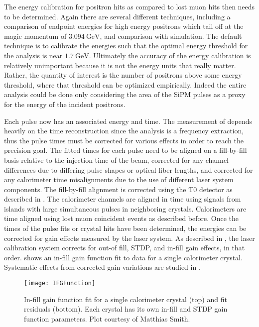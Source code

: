 The energy calibration for positron hits as compared to lost muon hits then needs to be determined. Again there are several different techniques, including a comparison of endpoint energies for high energy positrons which tail off at the magic momentum of $\SI{3.094}{\GeV}$, and comparison with simulation. The default technique is to calibrate the energies such that the optimal energy threshold for the \wa analysis is near $\SI{1.7}{\GeV}$. Ultimately the accuracy of the energy calibration is relatively unimportant because it is not the energy units that really matter. Rather, the quantity of interest is the number of positrons above some energy threshold, where that threshold can be optimized empirically. Indeed the entire \wa analysis could be done only considering the area of the SiPM pulses as a proxy for the energy of the incident positrons.


Each pulse now has an associated energy and time. The measurement of \wa depends heavily on the time reconstruction since the analysis is a frequency extraction, thus the pulse times must be corrected for various effects in order to reach the precision goal. The fitted times for each pulse need to be aligned on a fill-by-fill basis relative to the injection time of the beam, corrected for any channel differences due to differing pulse shapes or optical fiber lengths, and corrected for any calorimeter time misalignments due to the use of different laser system components. The fill-by-fill alignment is corrected using the T0 detector as described in . The calorimeter channels are aligned in time using signals from islands with large simultaneous pulses in neighboring crystals. Calorimeters are time aligned using lost muon coincident events as described before. Once the times of the pulse fits or crystal hits have been determined, the energies can be corrected for gain effects measured by the laser system. As described in , the laser calibration system corrects for out-of fill, STDP, and in-fill gain effects, in that order.  shows an in-fill gain function fit to data for a single calorimeter crystal. Systematic effects from corrected gain variations are studied in .

\begin{figure}
    \centering
    \texttt{[image: IFGFunction]}
    \caption[In-fill gain function fit for a single calorimeter crystal]{In-fill gain function fit for a single calorimeter crystal (top) and fit residuals (bottom). Each crystal has its own in-fill and STDP gain function parameters. Plot courtesy of Matthias Smith.}
    \label{fig:IFGFunction}
\end{figure}



